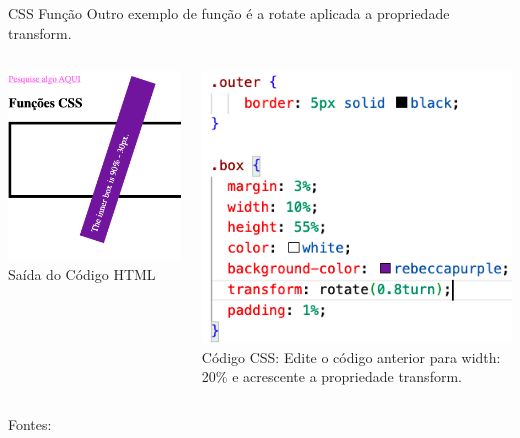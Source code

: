 \documentclass{beamer}
\begin{document}
\begin{frame}{CSS Função}
Outro exemplo de função é a rotate aplicada a propriedade transform.\\
\begin{columns}
\begin{column}{0.5\textwidth}
        \begin{center}
		  \includegraphics[height=0.4\paperheight]{fig/aula2/layout_html2.png} \\
		  \tiny{Saída do Código HTML}
	  \end{center}
   \end{column}
   \begin{column}{0.5\textwidth}
        \begin{center}
		  \includegraphics[height=0.4\paperheight]{fig/aula2/layout_css1.png} \\
		  \tiny{Código CSS: Edite o código anterior para width: 20\% e acrescente a propriedade transform.}
	  \end{center}
	  
   \end{column}
\end{columns}
 \tiny Fontes: \cite{mdn2023}
\end{frame}
\end{document}
